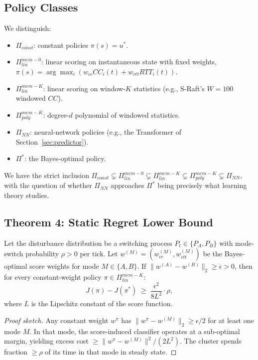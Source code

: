 \subsection{Policy Classes}

We distinguish:
\begin{itemize}\setlength\itemsep{1pt}
\item $\Pi_{const}$: constant policies $\pi(s) = u^*$.
\item $\Pi_{lin}^{mem-0}$: linear scoring on instantaneous state with
fixed weights, $\pi(s) = \arg\max_i (w_{cc} CC_i(t) + w_{rtt} RTT_i(t))$.
\item $\Pi_{lin}^{mem-K}$: linear scoring on window-$K$ statistics
(e.g., S-Raft's $W{=}100$ windowed $CC$).
\item $\Pi_{poly}^{mem-K}$: degree-$d$ polynomial of windowed statistics.
\item $\Pi_{NN}$: neural-network policies (e.g., the Transformer of
Section~\ref{sec:predictor}).
\item $\Pi^*$: the Bayes-optimal policy.
\end{itemize}
We have the strict inclusion
$\Pi_{const} \subsetneq \Pi_{lin}^{mem-0} \subsetneq \Pi_{lin}^{mem-K}
\subsetneq \Pi_{poly}^{mem-K} \subsetneq \Pi_{NN}$, with the question of
whether $\Pi_{NN}$ approaches $\Pi^*$ being precisely what learning
theory studies.

\subsection{Theorem 4: Static Regret Lower Bound}

\begin{theorem}
\label{thm:static-regret}
Let the disturbance distribution be a switching process
$P_t \in \{P_A, P_B\}$ with mode-switch probability $\rho > 0$ per tick.
Let $w^{(M)} = (w_{cc}^{(M)}, w_{rtt}^{(M)})$ be the Bayes-optimal score
weights for mode $M \in \{A, B\}$. If $\|w^{(A)} - w^{(B)}\|_2 \ge
\epsilon > 0$, then for every constant-weight policy
$\pi \in \Pi_{lin}^{mem-K}$:
\begin{equation}
  J(\pi) - J(\pi^*) \;\ge\; \frac{\epsilon^2}{8 L^2} \cdot \rho,
\end{equation}
where $L$ is the Lipschitz constant of the score function.
\end{theorem}

\begin{proof}[Proof sketch]
Any constant weight $w^\pi$ has $\|w^\pi - w^{(M)}\|_2 \ge \epsilon/2$ for
at least one mode $M$. In that mode, the score-induced classifier
operates at a sub-optimal margin, yielding excess cost
$\ge \|w^\pi - w^{(M)}\|^2 / (2 L^2)$. The cluster spends fraction
$\ge \rho$ of its time in that mode in steady state.
\end{proof}

